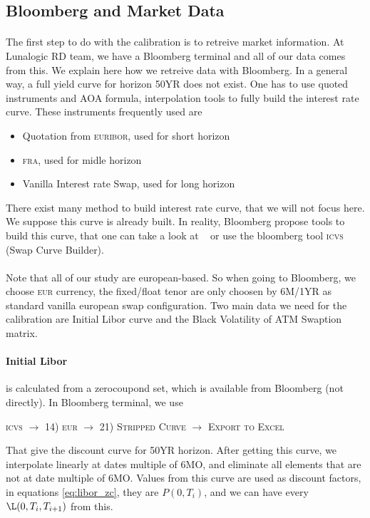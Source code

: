 \documentclass[a4paper,10pt]{article}
\newcommand{\bl}[1]{{\scshape  #1}}
\begin{document}
\subsection{Bloomberg and Market Data}
\paragraph{} The first step to do with the calibration is to retreive market information. At Lunalogic RD team, we have a Bloomberg terminal and all of our data comes from this. We explain here how we retreive data with Bloomberg. In a general way, a full yield curve for horizon 50YR does not exist. One has to use quoted instruments and AOA formula, interpolation tools to fully build the interest rate curve. These instruments frequently used are
\begin{itemize}
 \item Quotation from \bl{euribor}, used for short horizon
 \item \bl{fra}, used for midle horizon
 \item Vanilla Interest rate Swap, used for long horizon
\end{itemize}
There exist many method to build interest rate curve, that we will not focus here. We suppose this curve is already built. In reality, Bloomberg propose tools to build this curve, that one can take a look at ~\cite{BL2012} or use the bloomberg tool \bl{icvs} (Swap Curve Builder).
\paragraph{} Note that all of our study are european-based. So when going to Bloomberg, we choose \bl{eur} currency, the fixed/float tenor are only choosen by 6M/1YR as standard vanilla european swap configuration. Two main data we need for the calibration are Initial Libor curve and the Black Volatility of ATM Swaption matrix.   
\paragraph{Initial Libor} is calculated from a zerocoupond set, which is available from Bloomberg (not directly). In Bloomberg terminal, we use 
\begin{center}
\bl{icvs} $\longrightarrow$ \bl{14) eur} $\longrightarrow$ \bl{21) Stripped Curve} $\longrightarrow$  \bl{Export to Excel} 
\end{center}
That give the discount curve for 50YR horizon. After getting this curve, we interpolate linearly at dates multiple of 6MO, and eliminate all elements that are not at date multiple of 6MO. Values from this curve are used as discount factors, in equations \ref{eq:libor_zc}, they are $P(0,T_{i})$, and we can have every $\L(0,T_{i},T_{i+1})$ from this. 
\end{document}
